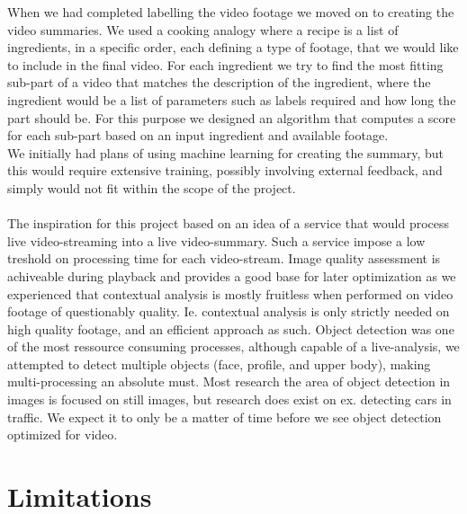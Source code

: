When we had completed labelling the video footage we moved on to creating the video summaries. We used a cooking analogy where a recipe is a list of ingredients, in a specific order, each defining a type of footage, that we would like to include in the final video. For each ingredient we try to find the most fitting sub-part of a video that matches the description of the ingredient, where the ingredient would be a list of parameters such as labels required and how long the part should be. For this purpose we designed an algorithm that computes a score for each sub-part based on an input ingredient and available footage.\\
We initially had plans of using machine learning for creating the summary, but this would require extensive training, possibly involving external feedback, and simply would not fit within the scope of the project.
\\\\
The inspiration for this project based on an idea of a service that would process live video-streaming into a live video-summary. Such a service impose a low treshold on processing time for each video-stream. Image quality assessment is achiveable during playback and provides a good base for later optimization as we experienced that contextual analysis is mostly fruitless when performed on video footage of questionably quality. Ie. contextual analysis is only strictly needed on high quality footage, and an efficient approach as such. Object detection was one of the most ressource consuming processes, although capable of a live-analysis, we attempted to detect multiple objects (face, profile, and upper body), making multi-processing an absolute must. Most research the area of object detection in images is focused on still images, but research does exist on ex. detecting cars in traffic. We expect it to only be a matter of time before we see object detection optimized for video.

%
\section{Limitations}\label{sec:conc_lims}
%
